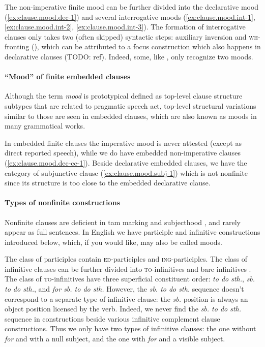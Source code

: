 \documentclass[UTF8, a4paper, oneside, scheme=plain, 12pt]{ctexbook}
\newcommand*{\citesec}[1]{\S~{#1}}
\newcommand*{\citechap}[1]{Ch.~{#1}}
\newcommand*{\citepage}[1]{p.~{#1}}
\newcommand*{\term}[1]{\emph{#1}}
\newcommand{\form}[1]{\emph{#1}}
\newcommand{\category}[1]{\textsc{#1}}
\newcommand{\formcat}[1]{\textsc{#1}}
\begin{document}
The non-imperative finite mood
can be further divided into the declarative mood (\ref{ex:clause.mood.dec-1})
and several interrogative moods (\ref{ex:clause.mood.int-1}, 
\ref{ex:clause.mood.int-2},
\ref{ex:clause.mood.int-3}).
The formation of interrogative clauses 
only takes two (often skipped) syntactic steps: 
auxiliary inversion and \category{wh}-fronting
(),
which can be attributed to a focus construction which also happens in declarative clauses (TODO: ref).
Indeed, some, like \citet[\citepage{25}]{dixon2005semantic}, only recognize two moods.


\paragraph*{``Mood'' of finite embedded clauses} 
Although the term \term{mood} is prototypical defined as
top-level clause structure subtypes that are related to pragmatic speech act, 
top-level structural variations similar to those are seen in embedded clauses,
which are also known as moods in many grammatical works.

In embedded finite clauses
the imperative mood is never attested (except as direct reported speech),
while we do have embedded non-imperative clauses (\ref{ex:clause.mood.dec-cc-1}).
Beside declarative embedded clauses,
we have the category of subjunctive clause (\ref{ex:clause.mood.subj-1})
which is not nonfinite since its structure is too close to 
the embedded declarative clause. 

\paragraph*{Types of nonfinite constructions} 
Nonfinite clauses are deficient in \acs{tam} marking and subjecthood
\citep[\citepage{1174}, {[5-7]}]{cgel},
and rarely appear as full sentences.
In English we have participle and infinitive constructions introduced below, 
which, if you would like, may also be called moods.

The class of participles contain \formcat{ed}-participles and \formcat{ing}-participles.
The class of infinitive clauses can be further divided into 
\formcat{to}-infinitives and bare infinitives \citet[\citechap{14}, \citesec{1.4.3}]{cgel}.
The class of \formcat{to}-infinitives have three superficial constituent order:
\form{to do sth.}, \form{sb. to do sth.}, and \form{for sb. to do sth.}
However, the \form{sb. to do sth.} sequence doesn't correspond to a separate type of infinitive clause:
the \form{sb.} position is always an object position licensed by the verb.
Indeed, we never find the \form{sb. to do sth.} sequence
in constructions beside various infinitive complement clause constructions.
Thus we only have two types of infinitive clauses:
the one without \form{for} and with a null subject,
and the one with \form{for} and a visible subject.
\end{document}
